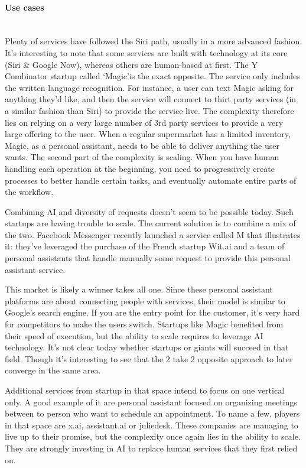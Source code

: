 \documentclass[12pt]{article}
\begin{document}
\paragraph{Use cases}
\\
Plenty of services have followed the Siri path, usually in a more advanced
fashion. It's interesting to note that some services are built with technology
at its core (Siri \& Google Now), whereas others are human-based at first. The Y
Combinator startup called \lq Magic\rq  is the exact opposite. The service only
includes the written language recognition. For instance, a user can text Magic
asking for anything they'd like, and then the service will connect to thirt
party services (in a similar fashion than Siri) to provide the service live. The
complexity therefore lies on relying on a very large number of 3rd party
services to provide a very large offering to the user. When a regular supermarket
has a limited inventory, Magic, as a personal assistant, needs to be able to
deliver anything the user wants. The second part of the complexity is scaling.
When you have human handling each operation at the beginning, you need to
progressively create processes to better handle certain tasks, and eventually
automate entire parts of the workflow.

Combining AI and diversity of requests doesn't seem to be possible today. Such
startups are having trouble to scale. The current solution is to combine a mix
of the two. Facebook Messenger recently launched a service called M that
illustrates it: they've leveraged the purchase of the French startup Wit.ai and
a team of personal assistants that handle manually some request to provide this
personal assistant service.

This market is likely a winner takes all one. Since these personal assistant
platforms are about connecting people with services, their model is similar to
Google's search engine. If you are the entry point for the customer, it's very
hard for competitors to make the users switch. Startups like Magic benefited
from their speed of execution, but the ability to scale requires to leverage AI
technology. It's not clear today whether startups or giants will succeed in that
field. Though it's interesting to see that the 2 take 2 opposite approach to
later converge in the same area.

Additional services from startup in that space intend to focus on one vertical
only. A good example of it are personal assistant focused on organizing meetings
between to person who want to schedule an appointment. To name a few, players in
that space are x.ai, assistant.ai or juliedesk. These companies are managing to
live up to their promise, but the complexity once again lies in the ability to
scale. They are strongly investing in AI to replace human services that they
first relied on.
\end{document}

